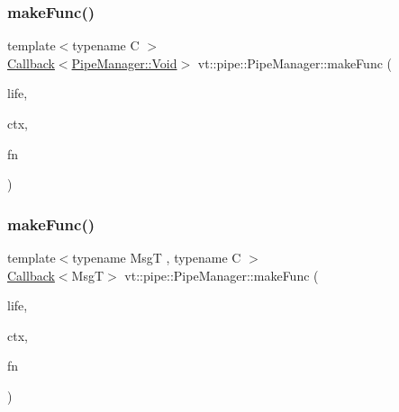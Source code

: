 \subsubsection{\texorpdfstring{make\+Func()}{makeFunc()}\hspace{0.1cm}{\footnotesize\ttfamily [1/6]}}
{\footnotesize\ttfamily template$<$typename C $>$ \\
\hyperlink{namespacevt_a36db99df4c973d48b1118a293fff533f}{Callback}$<$\hyperlink{structvt_1_1pipe_1_1_pipe_manager_ab720c2580ecfd3ab36e49aeaaff64cc6}{Pipe\+Manager\+::\+Void}$>$ vt\+::pipe\+::\+Pipe\+Manager\+::make\+Func (\begin{DoxyParamCaption}\item[{\hyperlink{namespacevt_1_1pipe_acb42b284378c0fdac1d7c6335dc26f58}{Lifetime\+Enum}}]{life,  }\item[{C $\ast$}]{ctx,  }\item[{\hyperlink{structvt_1_1pipe_1_1_pipe_manager_base_ad8463823b6b4cfdb67c119d6d22e3bac}{Func\+Ctx\+Type}$<$ C $>$}]{fn }\end{DoxyParamCaption})}

\mbox{\label{structvt_1_1pipe_1_1_pipe_manager_aeade0c95a974823a05ba925167c82889}} 
\subsubsection{\texorpdfstring{make\+Func()}{makeFunc()}\hspace{0.1cm}{\footnotesize\ttfamily [2/6]}}
{\footnotesize\ttfamily template$<$typename MsgT , typename C $>$ \\
\hyperlink{namespacevt_a36db99df4c973d48b1118a293fff533f}{Callback}$<$MsgT$>$ vt\+::pipe\+::\+Pipe\+Manager\+::make\+Func (\begin{DoxyParamCaption}\item[{\hyperlink{namespacevt_1_1pipe_acb42b284378c0fdac1d7c6335dc26f58}{Lifetime\+Enum}}]{life,  }\item[{C $\ast$}]{ctx,  }\item[{\hyperlink{structvt_1_1pipe_1_1_pipe_manager_base_a73fdf82ece0411b3dc644c99b763f7a9}{Func\+Msg\+Ctx\+Type}$<$ MsgT, C $>$}]{fn }\end{DoxyParamCaption})}

\mbox{\label{structvt_1_1pipe_1_1_pipe_manager_a9ceec59c887d0fa1498b931c788962f6}} 
